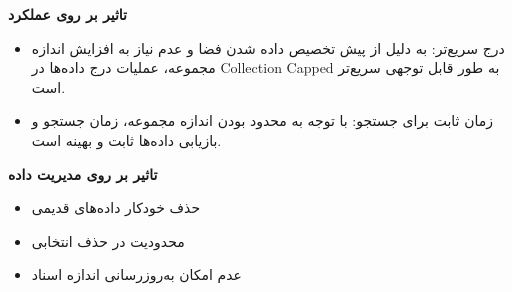  \textbf{تاثیر بر روی عملکرد}
 \begin{itemize}
 	\item درج سریع‌تر:
 	به دلیل از پیش تخصیص داده شدن فضا و عدم نیاز به افزایش اندازه مجموعه، عملیات درج داده‌ها در Collection Capped به طور قابل توجهی سریع‌تر است.
 	\item  زمان ثابت برای جستجو:
 	با توجه به محدود بودن اندازه مجموعه، زمان جستجو و بازیابی داده‌ها ثابت و بهینه است.
 \end{itemize}
  \textbf{تاثیر بر روی مدیریت داده}
   \begin{itemize}
  	\item حذف خودکار داده‌های قدیمی
  	\item محدودیت در حذف انتخابی
  	\item عدم امکان به‌روزرسانی اندازه اسناد
  	
  \end{itemize}